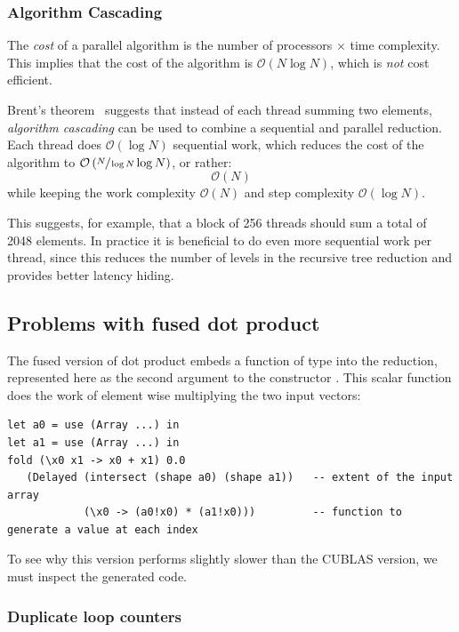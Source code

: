 \subsubsection{Algorithm Cascading}
\label{sec:algorithm_cascading}

The \emph{cost} of a parallel algorithm is the number of processors $\times$
time complexity. This implies that the cost of the algorithm is
$\mathcal{O}\left( N \log N \right)$, which is \emph{not} cost efficient.

Brent's theorem~\cite{Chatterjee:2009vh} suggests that instead of each thread
summing two elements, \emph{algorithm cascading} can be used to combine a
sequential and parallel reduction. Each thread does $\mathcal{O}\left( \log N
\right)$ sequential work, which reduces the cost of the algorithm to
$\mathcal{O}\left( \sfrac{N}{\log N} \log N \right)$, or rather:
\[
\mathcal{O}\left( N \right)
\]
while keeping the work complexity $\mathcal{O}\left( N \right)$ and step
complexity $\mathcal{O}\left( \log N \right)$.

This suggests, for example, that a block of 256 threads should sum a total of
2048 elements. In practice it is beneficial to do even more sequential work per
thread, since this reduces the number of levels in the recursive tree reduction
and provides better latency hiding.


\subsection{Problems with fused dot product}

The fused version of dot product embeds a function of type  into
the reduction, represented here as the second argument to the constructor
. This scalar function does the work of element wise multiplying
the two input vectors:
%
\begin{lstlisting}[style=haskell]
let a0 = use (Array ...) in
let a1 = use (Array ...) in
fold (\x0 x1 -> x0 + x1) 0.0
   (Delayed (intersect (shape a0) (shape a1))   -- extent of the input array
            (\x0 -> (a0!x0) * (a1!x0)))         -- function to generate a value at each index
\end{lstlisting}
%
To see why this version performs slightly slower than the CUBLAS version, we
must inspect the generated code.

\subsubsection{Duplicate loop counters}

